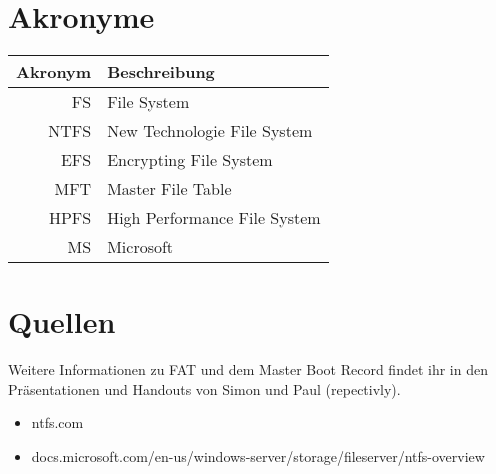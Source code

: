 \documentclass[11pt,a4paper]{article}
\begin{document}
\section{Akronyme}
\begin{table}[h!]
\begin{tabular}{r|l}
Akronym & Beschreibung\\
\hline
FS & File System\\
\hline
NTFS & New Technologie File System\\
\hline
EFS & Encrypting File System\\
\hline
MFT & Master File Table\\
\hline
HPFS & High Performance File System\\
\hline
MS & Microsoft
\end{tabular}
\end{table}

\section{Quellen}
Weitere Informationen zu FAT und dem Master Boot Record findet ihr in den Präsentationen und Handouts von Simon und Paul (repectivly).

\begin{itemize}
\item ntfs.com
\item docs.microsoft.com/en-us/windows-server/storage/fileserver/ntfs-overview
\end{itemize}
\end{document}
